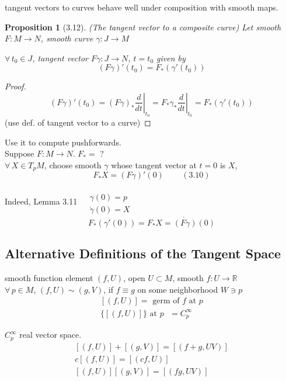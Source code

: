 \documentclass[11pt]{amsart}
\newtheorem{proposition}{Proposition}
\theoremstyle{definition}
\begin{document}
tangent vectors to curves behave well under composition with smooth maps.

\begin{proposition}[3.12] (The tangent vector to a composite curve)
 Let smooth $F: M \to N$, smooth curve $\gamma : J \to M$

$\forall\, t_0 \in J$, tangent vector $F\gamma:J\to N$, $t=t_0$ given by
\[
(F\gamma)'(t_0) = F_*(\gamma'(t_0))
\]
\end{proposition}

\begin{proof}
\[
(F\gamma)'(t_0) = \left. (F\gamma)_* \frac{d}{dt} \right|_{t_0} = F_* \gamma_* \left. \frac{d}{dt} \right|_{t_0} = F_*(\gamma'(t_0))
\]
(use def. of tangent vector to a curve)
\end{proof}

Use it to compute pushforwards. \\
Suppose $F:M \to N$.  $F_* = $ ? \\
$\forall \, X \in T_pM$, choose smooth $\gamma$ whose tangent vector at $t=0$ is $X$,
\[
F_* X = (F\gamma)'(0) \quad \quad \, (3.10)
\]

Indeed, Lemma 3.11 $\begin{aligned} & \quad \\
  & \gamma(0) = p \\
  & \dot{\gamma}(0) = X \end{aligned}$
\[
F_*(\gamma'(0)) = F_*X = \dot{ (F\gamma)}(0)
\]

\subsection*{ Alternative Definitions of the Tangent Space}

smooth function element $(f,U)$, open $U \subset M$, smooth $f:U \to \mathbb{R}$\\
$\forall \, p \in M$, $(f,U) \sim (g,V)$, if $f\equiv g$ on some neighborhood $W \ni p$
\[
\begin{gathered}
  [ (f,U)] = \text{ germ of $f$ at $p$} \\
 \lbrace [ (f,U) ] \rbrace \text{ at $p$ } = C_p^{\infty}
\end{gathered}
\]

$C^{\infty}_p$ real vector space.
\[
\begin{gathered}
  \left[ (f,U) \right] + [(g,V)] = [(f+g, UV) ] \\
 c[(f,U)] = [(cf, U) ] \\
 [(f,U)] [(g,V)] = [ (fg, UV)]
\end{gathered}
\]
\end{document}

